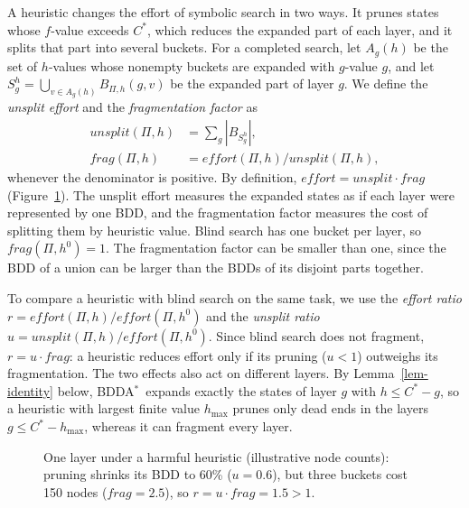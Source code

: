 \documentclass[letterpaper]{article}
\newcommand{\task}{\ensuremath{\Pi}}
\newcommand{\hblind}{\ensuremath{h^{0}}}
\newcommand{\copt}{\ensuremath{C^{*}}}
\newcommand{\bddsize}[1]{\ensuremath{|B_{#1}|}}
\newcommand{\effort}{\ensuremath{\mathit{effort}}}
\newcommand{\unioneffort}{\ensuremath{\mathit{unsplit}}}
\newcommand{\fragfactor}{\ensuremath{\mathit{frag}}}
\newcommand{\bddastar}{BDDA\ensuremath{^{*}}}
\theoremstyle{plain}
\theoremstyle{definition}
\theoremstyle{remark}
\begin{document}
A heuristic changes the effort of symbolic search in two ways.
It prunes states whose $f$-value exceeds \copt, which reduces the expanded part of each layer, and it splits that part into several buckets.
For a completed search, let $A_g(h)$ be the set of $h$-values whose nonempty buckets are expanded with $g$-value $g$, and let $S_g^h=\bigcup_{v\in A_g(h)}B_{\task,h}(g,v)$ be the expanded part of layer $g$.
We define the \emph{unsplit effort} and the \emph{fragmentation factor} as
\[
 \begin{aligned}
 \unioneffort(\task,h)&=\textstyle\sum_g\bddsize{S_g^h},\\
 \fragfactor(\task,h)&=\effort(\task,h)/\unioneffort(\task,h),
 \end{aligned}
\]
whenever the denominator is positive.
By definition, $\effort=\unioneffort\cdot\fragfactor$ (Figure~\ref{fig:factorization}).
The unsplit effort measures the expanded states as if each layer were represented by one BDD, and the fragmentation factor measures the cost of splitting them by heuristic value.
Blind search has one bucket per layer, so $\fragfactor(\task,\hblind)=1$.
The fragmentation factor can be smaller than one, since the BDD of a union can be larger than the BDDs of its disjoint parts together.

To compare a heuristic with blind search on the same task, we use the \emph{effort ratio} $r=\effort(\task,h)/\effort(\task,\hblind)$ and the \emph{unsplit ratio} $u=\unioneffort(\task,h)/\effort(\task,\hblind)$.
Since blind search does not fragment, $r=u\cdot\fragfactor$: a heuristic reduces effort only if its pruning ($u<1$) outweighs its fragmentation.
The two effects also act on different layers.
By Lemma~\ref{lem-identity} below, \bddastar\ expands exactly the states of layer $g$ with $h\leq\copt-g$, so a heuristic with largest finite value $h_{\max}$ prunes only dead ends in the layers $g\leq\copt-h_{\max}$, whereas it can fragment every layer.

\begin{figure}[tb]
  \centering
  \scriptsize
  \caption{One layer under a harmful heuristic (illustrative node counts):
    pruning shrinks its BDD to 60\% ($u=0.6$), but three buckets cost 150
    nodes ($\fragfactor=2.5$), so $r=u\cdot\fragfactor=1.5>1$.}
  \label{fig:factorization}
\end{figure}
\end{document}
